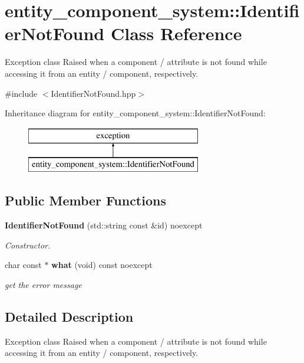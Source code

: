 \section{entity\+\_\+component\+\_\+system\+:\+:Identifier\+Not\+Found Class Reference}
\label{classentity__component__system_1_1_identifier_not_found}


Exception class Raised when a component / attribute is not found while accessing it from an entity / component, respectively.  




{\ttfamily \#include $<$Identifier\+Not\+Found.\+hpp$>$}

Inheritance diagram for entity\+\_\+component\+\_\+system\+:\+:Identifier\+Not\+Found\+:\begin{figure}[H]
\begin{center}
\leavevmode
\includegraphics[height=2.000000cm]{d0/d3f/classentity__component__system_1_1_identifier_not_found}
\end{center}
\end{figure}
\subsection*{Public Member Functions}
\begin{DoxyCompactItemize}
\item 
{\bf Identifier\+Not\+Found} (std\+::string const \&id) noexcept
\begin{DoxyCompactList}\small\item\em Constructor. \end{DoxyCompactList}\item 
char const  $\ast$ {\bf what} (void) const noexcept
\begin{DoxyCompactList}\small\item\em get the error message \end{DoxyCompactList}\end{DoxyCompactItemize}


\subsection{Detailed Description}
Exception class Raised when a component / attribute is not found while accessing it from an entity / component, respectively. 

